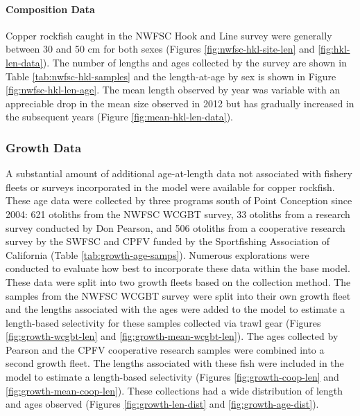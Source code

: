 \documentclass[11pt,
  english,
  letterpaper,
]{article}
\begin{document}
\hypertarget{composition-data-3}{%
\paragraph{Composition Data}\label{composition-data-3}}

\hfill\break

Copper rockfish caught in the NWFSC Hook and Line survey were generally between 30 and 50 cm for both sexes (Figures \ref{fig:nwfsc-hkl-site-len} and \ref{fig:hkl-len-data}). The number of lengths and ages collected by the survey are shown in Table \ref{tab:nwfsc-hkl-samples} and the length-at-age by sex is shown in Figure \ref{fig:nwfsc-hkl-len-age}. The mean length observed by year was variable with an appreciable drop in the mean size observed in 2012 but has gradually increased in the subsequent years (Figure \ref{fig:mean-hkl-len-data}).

\hypertarget{growth-data}{%
\subsubsection{Growth Data}\label{growth-data}}

A substantial amount of additional age-at-length data not associated with fishery fleets or surveys incorporated in the model were available for copper rockfish. These age data were collected by three programs south of Point Conception since 2004: 621 otoliths from the NWFSC WCGBT survey, 33 otoliths from a research survey conducted by Don Pearson, and 506 otoliths from a cooperative research survey by the SWFSC and CPFV funded by the Sportfishing Association of California (Table \ref{tab:growth-age-samps}). Numerous explorations were conducted to evaluate how best to incorporate these data within the base model. These data were split into two growth fleets based on the collection method. The samples from the NWFSC WCGBT survey were split into their own growth fleet and the lengths associated with the ages were added to the model to estimate a length-based selectivity for these samples collected via trawl gear (Figures \ref{fig:growth-wcgbt-len} and \ref{fig:growth-mean-wcgbt-len}). The ages collected by Pearson and the CPFV cooperative research samples were combined into a second growth fleet. The lengths associated with these fish were included in the model to estimate a length-based selectivity (Figures \ref{fig:growth-coop-len} and \ref{fig:growth-mean-coop-len}). These collections had a wide distribution of length and ages observed (Figures \ref{fig:growth-len-dist} and \ref{fig:growth-age-dist}).
\end{document}
